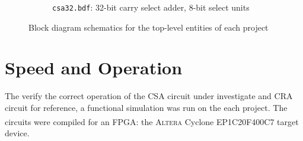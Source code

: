 \documentclass[a4paper,11pt]{article}
\newcommand{\Altera}{\textsc{Altera}\textsuperscript{\textregistered}\xspace}
\begin{document}
\begin{figure}[!h]
\begin{subfigure}[b]{\textwidth}
		\caption{\texttt{csa32.bdf}: 32-bit carry select adder, 8-bit select units}
		\label{fig:csa32.bdf}
	\end{subfigure}
	\caption{Block diagram schematics for the top-level entities of each project}
	\label{fig:top-level}
\end{figure}

\section{Speed and Operation}

The verify the correct operation of the CSA circuit under investigate and CRA circuit for reference, a functional simulation was run on the each project. The circuits were compiled for an FPGA: the \Altera Cyclone EP1C20F400C7 target device.
\end{document}
